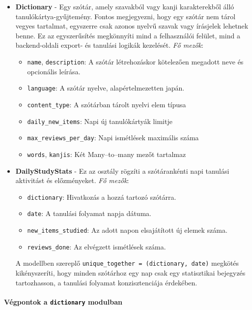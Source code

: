 \begin{itemize}
  \item \textbf{Dictionary} - Egy szótár, amely szavakból vagy kanji karakterekből álló tanulókártya-gyűjtemény. Fontos megjegyezni, hogy egy szótár nem tárol vegyes tartalmat, egyszerre csak azonos nyelvű szavak vagy írásjelek lehetnek benne. Ez az egyszerűsítés megkönnyíti mind a felhasználói felület, mind a backend-oldali export- és tanulási logikák kezelését.
  \textit{Fő mezők}:
  \begin{itemize}
    \item \texttt{name}, \texttt{description}: A szótár létrehozáskor kötelezően megadott neve és opcionális leírása.
    \item \texttt{language}: A szótár nyelve, alapértelmezetten japán.
    \item \texttt{content\_type}: A szótárban tárolt nyelvi elem típusa
    \item \texttt{daily\_new\_items}: Napi új tanulókártyák limitje
    \item \texttt{max\_reviews\_per\_day}: Napi ismétlések maximális száma
    \item \texttt{words}, \texttt{kanjis}: Két Many–to–many mezőt tartalmaz
  \end{itemize}

  \item \textbf{DailyStudyStats} - Ez az osztály rögzíti a szótárankénti napi tanulási aktivitást és előzményeket.
  \textit{Fő mezők}:
  \begin{itemize}
    \item \texttt{dictionary}: Hivatkozás a hozzá tartozó szótárra.
    \item \texttt{date}: A tanulási folyamat napja dátuma.
    \item \texttt{new\_items\_studied}: Az adott napon elsajátított új elemek száma.
    \item \texttt{reviews\_done}: Az elvégzett ismétlések száma.
  \end{itemize}
  A modellben szereplő \texttt{unique\_together = (dictionary, date)} megkötés kikényszeríti, hogy minden szótárhoz egy nap csak egy statisztikai bejegyzés tartozhasson, a tanulási folyamat konzisztenciája érdekében. 

\end{itemize}

\paragraph{Végpontok a \texttt{dictionary} modulban}

